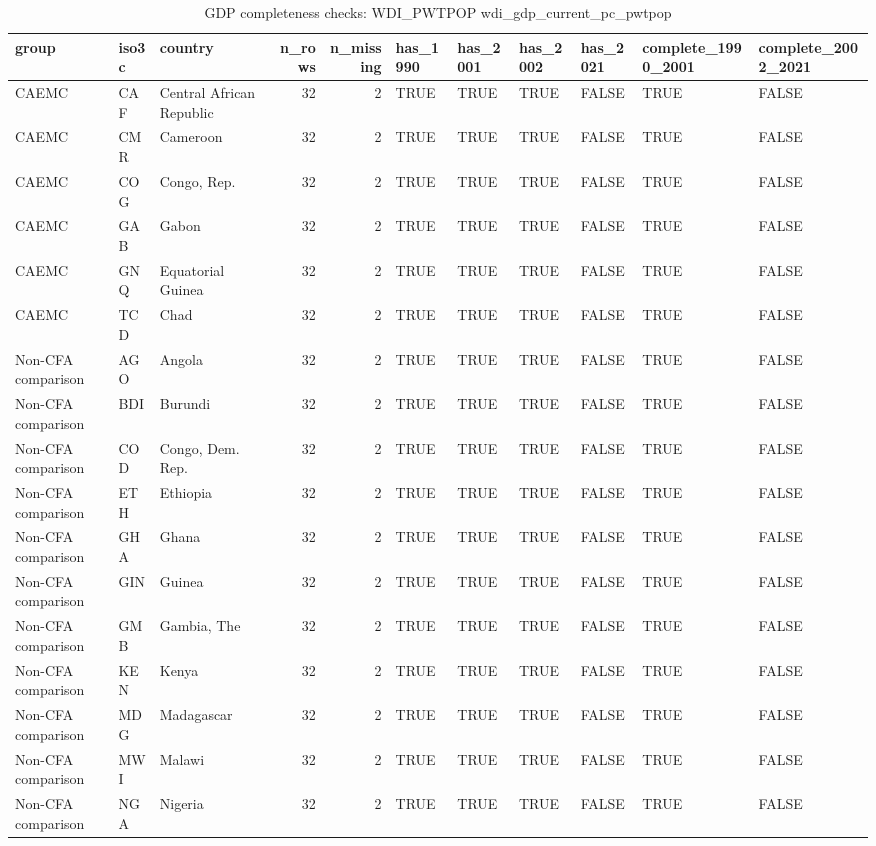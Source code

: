\begin{table}

\caption{GDP completeness checks: WDI_PWTPOP wdi_gdp_current_pc_pwtpop}
\centering
\begin{tabular}[t]{lllrrllllll}
\toprule
group & iso3c & country & n\_rows & n\_missing & has\_1990 & has\_2001 & has\_2002 & has\_2021 & complete\_1990\_2001 & complete\_2002\_2021\\
\midrule
CAEMC & CAF & Central African Republic & 32 & 2 & TRUE & TRUE & TRUE & FALSE & TRUE & FALSE\\
CAEMC & CMR & Cameroon & 32 & 2 & TRUE & TRUE & TRUE & FALSE & TRUE & FALSE\\
CAEMC & COG & Congo, Rep. & 32 & 2 & TRUE & TRUE & TRUE & FALSE & TRUE & FALSE\\
CAEMC & GAB & Gabon & 32 & 2 & TRUE & TRUE & TRUE & FALSE & TRUE & FALSE\\
CAEMC & GNQ & Equatorial Guinea & 32 & 2 & TRUE & TRUE & TRUE & FALSE & TRUE & FALSE\\
\addlinespace
CAEMC & TCD & Chad & 32 & 2 & TRUE & TRUE & TRUE & FALSE & TRUE & FALSE\\
Non-CFA comparison & AGO & Angola & 32 & 2 & TRUE & TRUE & TRUE & FALSE & TRUE & FALSE\\
Non-CFA comparison & BDI & Burundi & 32 & 2 & TRUE & TRUE & TRUE & FALSE & TRUE & FALSE\\
Non-CFA comparison & COD & Congo, Dem. Rep. & 32 & 2 & TRUE & TRUE & TRUE & FALSE & TRUE & FALSE\\
Non-CFA comparison & ETH & Ethiopia & 32 & 2 & TRUE & TRUE & TRUE & FALSE & TRUE & FALSE\\
\addlinespace
Non-CFA comparison & GHA & Ghana & 32 & 2 & TRUE & TRUE & TRUE & FALSE & TRUE & FALSE\\
Non-CFA comparison & GIN & Guinea & 32 & 2 & TRUE & TRUE & TRUE & FALSE & TRUE & FALSE\\
Non-CFA comparison & GMB & Gambia, The & 32 & 2 & TRUE & TRUE & TRUE & FALSE & TRUE & FALSE\\
Non-CFA comparison & KEN & Kenya & 32 & 2 & TRUE & TRUE & TRUE & FALSE & TRUE & FALSE\\
Non-CFA comparison & MDG & Madagascar & 32 & 2 & TRUE & TRUE & TRUE & FALSE & TRUE & FALSE\\
\addlinespace
Non-CFA comparison & MWI & Malawi & 32 & 2 & TRUE & TRUE & TRUE & FALSE & TRUE & FALSE\\
Non-CFA comparison & NGA & Nigeria & 32 & 2 & TRUE & TRUE & TRUE & FALSE & TRUE & FALSE\\

\end{tabular}
\end{table}
